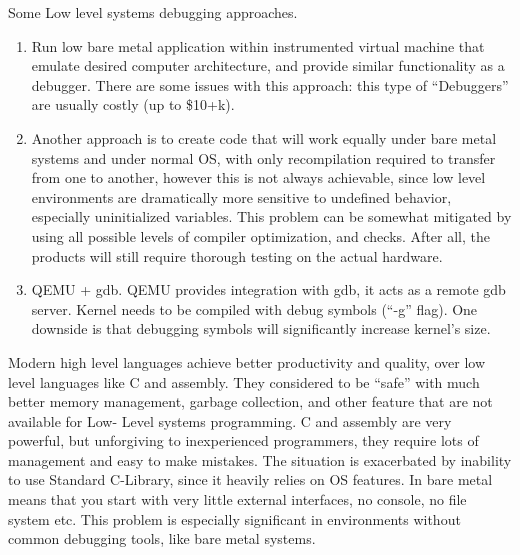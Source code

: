 \documentclass{article}
\begin{document}
Some Low level systems debugging approaches.
\begin{enumerate}[1.]
\item Run low bare metal application within instrumented virtual machine that emulate desired 
computer architecture, and provide similar functionality as a debugger.
    There are some issues with this approach: this type of ``Debuggers'' are
usually costly (up to \$10+k).
\item Another approach is to create code that will
work equally under bare metal systems and under normal OS, with only recompilation required
to transfer from one to another, however this is not always achievable, since low level 
environments are dramatically more sensitive to undefined
behavior, especially uninitialized variables. This problem can be somewhat mitigated by 
using all
possible levels of compiler optimization, and checks. After all, the products will still 
require thorough testing on the actual hardware.
\item QEMU + gdb. QEMU provides integration with gdb, it acts as a remote gdb server. 
Kernel needs to be compiled with debug symbols (``-g'' flag). One downside is that
debugging symbols will significantly increase kernel's size.
\end{enumerate}

Modern high level languages achieve better productivity and quality, over low level
languages like C and assembly.  They considered to be ``safe'' with much better memory
management, garbage collection, and other feature that are not available for Low-
Level systems programming. 
C and assembly are very powerful,
but unforgiving to inexperienced programmers, they require lots of management and easy
to make mistakes. The situation is exacerbated by inability to use Standard C-Library,
since it heavily relies on OS features. In bare metal means that you start with very
little external interfaces, no console, no file system etc.
This problem is especially significant in environments without common
debugging tools, like bare metal systems.

\end{document}
